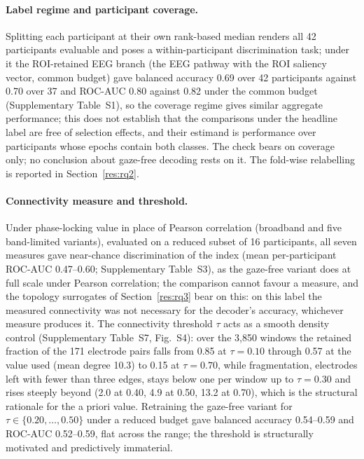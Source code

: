 \documentclass[pdflatex,sn-basic,Numbered,twocolumn,iicol]{sn-jnl}
\theoremstyle{thmstyleone}%
\theoremstyle{thmstyletwo}%
\theoremstyle{thmstylethree}%
\begin{document}
\paragraph{Label regime and participant coverage.} Splitting each participant at their own rank-based median renders all 42 participants evaluable and poses a within-participant discrimination task; under it the ROI-retained EEG branch (the EEG pathway with the ROI saliency vector, common budget) gave balanced accuracy 0.69 over 42 participants against 0.70 over 37 and ROC-AUC 0.80 against 0.82 under the common budget (Supplementary Table~S1), so the coverage regime gives similar aggregate performance; this does not establish that the comparisons under the headline label are free of selection effects, and their estimand is performance over participants whose epochs contain both classes. The check bears on coverage only; no conclusion about gaze-free decoding rests on it. The fold-wise relabelling is reported in Section~\ref{res:rq2}.

\paragraph{Connectivity measure and threshold.} Under phase-locking value in place of Pearson correlation (broadband and five band-limited variants), evaluated on a reduced subset of 16 participants, all seven measures gave near-chance discrimination of the index (mean per-participant ROC-AUC 0.47--0.60; Supplementary Table~S3), as the gaze-free variant does at full scale under Pearson correlation; the comparison cannot favour a measure, and the topology surrogates of Section~\ref{res:rq3} bear on this: on this label the measured connectivity was not necessary for the decoder's accuracy, whichever measure produces it. The connectivity threshold $\tau$ acts as a smooth density control (Supplementary Table~S7, Fig.~S4): over the 3{,}850 windows the retained fraction of the 171 electrode pairs falls from 0.85 at $\tau=0.10$ through 0.57 at the value used (mean degree 10.3) to 0.15 at $\tau=0.70$, while fragmentation, electrodes left with fewer than three edges, stays below one per window up to $\tau=0.30$ and rises steeply beyond (2.0 at 0.40, 4.9 at 0.50, 13.2 at 0.70), which is the structural rationale for the a priori value. Retraining the gaze-free variant for $\tau\in\{0.20,\dots,0.50\}$ under a reduced budget gave balanced accuracy 0.54--0.59 and ROC-AUC 0.52--0.59, flat across the range; the threshold is structurally motivated and predictively immaterial.
\end{document}
